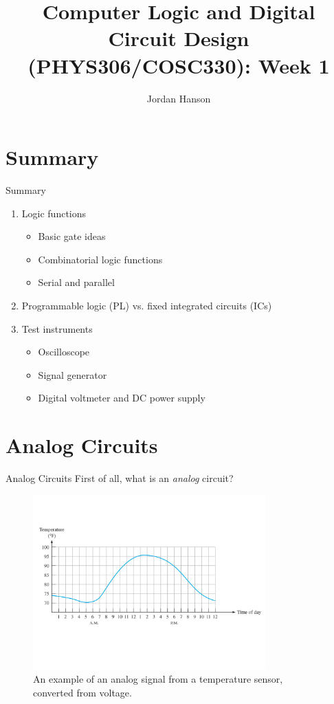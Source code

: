 \documentclass{beamer}
\title{Computer Logic and Digital Circuit Design (PHYS306/COSC330): Week 1}
\author{Jordan Hanson}
\institute{Whittier College Department of Physics and Astronomy}
\begin{document}
\maketitle

\section{Summary}

\begin{frame}{Summary}
\begin{enumerate}
\item Logic functions
\begin{itemize}
\item Basic gate ideas
\item Combinatorial logic functions
\item Serial and parallel
\end{itemize}
\item Programmable logic (PL) vs. fixed integrated circuits (ICs)
\item Test instruments
\begin{itemize}
\item Oscilloscope
\item Signal generator
\item Digital voltmeter and DC power supply
\end{itemize}
\end{enumerate}
\end{frame}

\section{Analog Circuits}

\begin{frame}{Analog Circuits}
\small
First of all, what is an \textit{analog} circuit?
\begin{figure}
\includegraphics[width=0.8\textwidth,trim=0cm 4cm 0cm 4cm,clip=true]{analog1.pdf}
\caption{\label{fig:analog1} An example of an analog signal from a temperature sensor, converted from voltage.}
\end{figure}
\end{frame}
\end{document}
